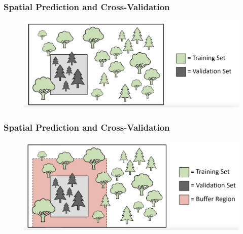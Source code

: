 \documentclass[
  shownotes,
  xcolor={svgnames},
  hyperref={colorlinks,citecolor=DarkBlue,linkcolor=andesred,urlcolor=DarkBlue}
  , aspectratio=169]{beamer}
\begin{document}
\begin{frame}[fragile]
\frametitle{Spatial Prediction and Cross-Validation}

  \begin{minipage}[c]{0.6\linewidth}
        
      \begin{figure}[H] \centering
        \captionsetup{justification=centering}
        \includegraphics[scale=0.3]{figures/spatial_cross/fig10.png}
      \end{figure}
           
    \end{minipage}
    \hfill
    \begin{minipage}[t]{0.35\linewidth}%
    

    \end{minipage}

\end{frame}
\begin{frame}[fragile]
\frametitle{Spatial Prediction and Cross-Validation}

  \begin{minipage}[c]{0.6\linewidth}
        
      \begin{figure}[H] \centering
        \captionsetup{justification=centering}
        \includegraphics[scale=0.3]{figures/spatial_cross/fig11.png}
      \end{figure}
           
    \end{minipage}
    \hfill
    \begin{minipage}[t]{0.35\linewidth}%
    

    \end{minipage}

\end{frame}
\end{document}
